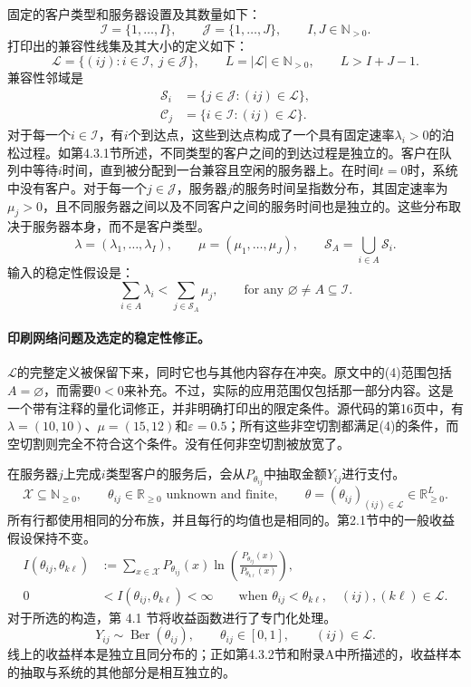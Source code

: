 \documentclass{article}
\begin{document}
固定的客户类型和服务器设置及其数量如下：
\[
\mathcal I=\{1,\ldots,I\},\qquad
\mathcal J=\{1,\ldots,J\},\qquad I,J\in\mathbb N_{>0}.
\]
打印出的兼容性线集及其大小的定义如下：
\[
\mathcal L=\{(ij):i\in\mathcal I,\ j\in\mathcal J\},\qquad
L=|\mathcal L|\in\mathbb N_{>0},\qquad L>I+J-1.
\]
兼容性邻域是
\begin{align}
\mathcal S_i&=\{j\in\mathcal J:(ij)\in\mathcal L\},\tag{2}\\
\mathcal C_j&=\{i\in\mathcal I:(ij)\in\mathcal L\}.\tag{3}
\end{align}
对于每一个$i\in\mathcal I$，有$i$个到达点，这些到达点构成了一个具有固定速率$\lambda_i>0$的泊松过程。如第4.3.1节所述，不同类型的客户之间的到达过程是独立的。客户在队列中等待$i$时间，直到被分配到一台兼容且空闲的服务器上。在时间$t=0$时，系统中没有客户。对于每一个$j\in\mathcal J$，服务器$j$的服务时间呈指数分布，其固定速率为$\mu_j>0$，且不同服务器之间以及不同客户之间的服务时间也是独立的。这些分布取决于服务器本身，而不是客户类型。
\[
\lambda=(\lambda_1,\ldots,\lambda_I),\qquad
\mu=(\mu_1,\ldots,\mu_J),\qquad
\mathcal S_A=\bigcup_{i\in A}\mathcal S_i.
\]
输入的稳定性假设是：
\begin{equation}
\sum_{i\in A}\lambda_i<\sum_{j\in\mathcal S_A}\mu_j,
\qquad\text{for any }\varnothing\ne A\subseteq\mathcal I.
\tag{4}
\end{equation}

\paragraph{印刷网络问题及选定的稳定性修正。}
$\mathcal L$的完整定义被保留下来，同时它也与其他内容存在冲突。原文中的(4)范围包括$A=\varnothing$，而需要$0<0$来补充。不过，实际的应用范围仅包括那一部分内容。这是一个带有注释的量化词修正，并非明确打印出的限定条件。源代码的第16页中，有$\lambda=(10,10)$、$\mu=(15,12)$和$\varepsilon=0.5$；所有这些非空切割都满足(4)的条件，而空切割则完全不符合这个条件。没有任何非空切割被放宽了。

在服务器$j$上完成$i$类型客户的服务后，会从$P_{\theta_{ij}}$中抽取金额$Y_{ij}$进行支付。
\[
\mathcal X\subseteq\mathbb N_{\geq0},\qquad
\theta_{ij}\in\mathbb R_{\geq0}\text{ unknown and finite},\qquad
\theta=(\theta_{ij})_{(ij)\in\mathcal L}\in\mathbb R_{\geq0}^{L}.
\]
所有行都使用相同的分布族，并且每行的均值也是相同的。第2.1节中的一般收益假设保持不变。
\begin{align}
I(\theta_{ij},\theta_{k\ell})
&:=\sum_{x\in\mathcal X}P_{\theta_{ij}}(x)
\ln\!\left(\frac{P_{\theta_{ij}}(x)}{P_{\theta_{k\ell}}(x)}\right),\tag{5}\\
0&<I(\theta_{ij},\theta_{k\ell})<\infty
\qquad\text{when }\theta_{ij}<\theta_{k\ell},
\quad (ij),(k\ell)\in\mathcal L.\tag{6}
\end{align}
对于所选的构造，第 4.1 节将收益函数进行了专门化处理。
\[
Y_{ij}\sim\operatorname{Ber}(\theta_{ij}),\qquad
\theta_{ij}\in[0,1],\qquad (ij)\in\mathcal L.
\]
线上的收益样本是独立且同分布的；正如第4.3.2节和附录A中所描述的，收益样本的抽取与系统的其他部分是相互独立的。
\end{document}
